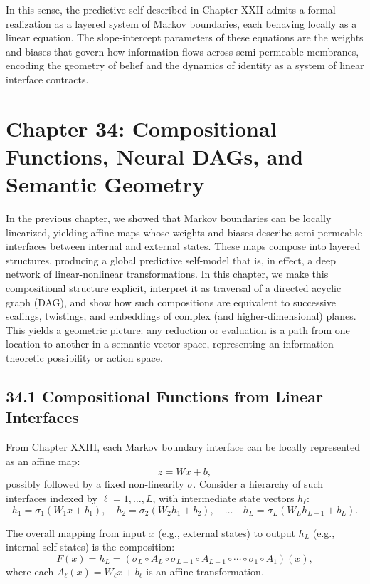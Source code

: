\documentclass[12pt,letterpaper]{article}
\theoremstyle{remark}
\begin{document}
In this sense, the predictive self described in Chapter XXII admits a formal realization as a layered system of Markov boundaries, each behaving locally as a linear equation. The slope-intercept parameters of these equations are the weights and biases that govern how information flows across semi-permeable membranes, encoding the geometry of belief and the dynamics of identity as a system of linear interface contracts.

\newpage
\section{Chapter 34: Compositional Functions, Neural DAGs, and Semantic Geometry}

In the previous chapter, we showed that Markov boundaries can be locally linearized, yielding affine maps whose weights and biases describe semi-permeable interfaces between internal and external states. These maps compose into layered structures, producing a global predictive self-model that is, in effect, a deep network of linear-nonlinear transformations. In this chapter, we make this compositional structure explicit, interpret it as traversal of a directed acyclic graph (DAG), and show how such compositions are equivalent to successive scalings, twistings, and embeddings of complex (and higher-dimensional) planes. This yields a geometric picture: any reduction or evaluation is a path from one location to another in a semantic vector space, representing an information-theoretic possibility or action space.

\subsection{34.1 Compositional Functions from Linear Interfaces}

From Chapter XXIII, each Markov boundary interface can be locally represented as an affine map:
\[
z = W x + b,
\]
possibly followed by a fixed non-linearity $\sigma$. Consider a hierarchy of such interfaces indexed by $\ell = 1, \dots, L$, with intermediate state vectors $h_\ell$:
\[
h_1 = \sigma_1(W_1 x + b_1), \quad
h_2 = \sigma_2(W_2 h_1 + b_2), \quad \dots \quad
h_L = \sigma_L(W_L h_{L-1} + b_L).
\]

The overall mapping from input $x$ (e.g., external states) to output $h_L$ (e.g., internal self-states) is the composition:
\[
F(x) = h_L = (\sigma_L \circ A_L \circ \sigma_{L-1} \circ A_{L-1} \circ \cdots \circ \sigma_1 \circ A_1)(x),
\]
where each $A_\ell(x) = W_\ell x + b_\ell$ is an affine transformation.
\end{document}
